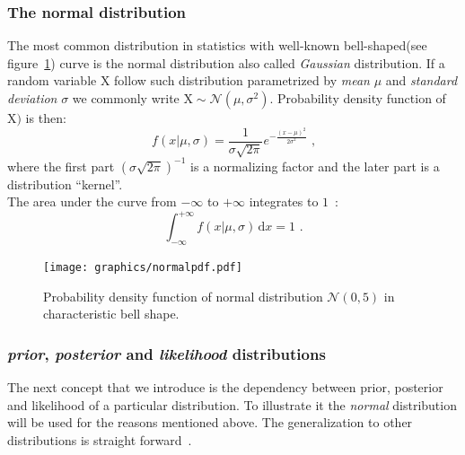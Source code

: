 \documentclass[12pt, a4paper, pdflatex, leqno]{report}
\begin{document}
\subsubsection{The normal distribution}
The most common distribution in statistics with well-known bell-shaped(see figure~\ref{fig:normaldist}) curve is the normal distribution also called \emph{Gaussian} distribution. If a random variable $\mathrm{X}$ follow such distribution parametrized by \emph{mean} $\mu$ and \emph{standard deviation} $\sigma$ we commonly write $\mathrm{X} \sim \mathcal{N}\left( \mu, \sigma^2 \right)$. Probability density function of $\mathrm{X})$ is then:
$$
f \left(x | \mu, \sigma \right) = \frac{1}{\sigma \sqrt{2 \pi }} e^{- \frac{ {\left (  x - \mu \right )}^2 }{2 \sigma^2} } \text{ ,}
$$
where the first part ${\left( \sigma \sqrt{2 \pi } \right)}^{-1}$ is a normalizing factor and the later part is a distribution ``kernel''.\\
The area under the curve from $-\infty$ to $+\infty$ integrates to $1$~\citep{rice1995mathematical}:
$$
\int_{-\infty}^{+\infty} \! f \left(x | \mu, \sigma \right) \, \mathrm{d}x = 1 \text{ .}
$$


\begin{figure}[htbp]
\centering
\texttt{[image: graphics/normalpdf.pdf]}
\begin{tiny}
\caption{Probability density function of normal distribution $\mathcal{N}\left( 0, 5 \right)$ in characteristic bell shape.\label{fig:normaldist}}
\end{tiny}
\vspace{1cm}
\end{figure}



\subsubsection{\emph{prior}, \emph{posterior} and \emph{likelihood} distributions}
The next concept that we introduce is the dependency between prior, posterior and likelihood of a particular distribution. To illustrate it the \emph{normal} distribution will be used for the reasons mentioned above. The generalization to other distributions is straight forward~\citep{gelman2003bayesian}.\\
\end{document}
